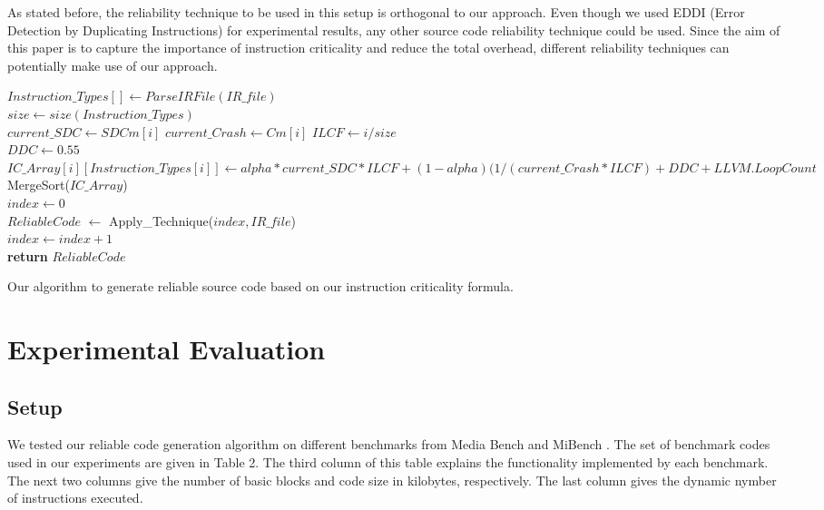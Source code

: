  As stated before, the reliability technique to be used in this setup is orthogonal to our approach. Even though we used  EDDI (Error Detection by Duplicating Instructions) \cite{EDDI:2002} for experimental results, any other source code reliability technique could be used. Since the aim of this paper is to capture the importance of instruction criticality and reduce the total overhead, different reliability techniques can potentially make use of our approach.

\begin{algorithm}
\BlankLine
$Instruction\_Types[] \longleftarrow ParseIRFile(IR\_file)$ \\
$size \longleftarrow size(Instruction\_Types)$ \\

{
{
{
$current\_SDC \longleftarrow SDCm[i]$
}
{
$current\_Crash \longleftarrow Cm[i]$
}
}
$ILCF \longleftarrow i / size$\\
{
  $DDC \longleftarrow 0.55$
}
$IC\_Array[i][Instruction\_Types[i]] \longleftarrow alpha * current\_SDC * ILCF + (1-alpha)(1/(current\_Crash * ILCF) + DDC + LLVM.LoopCount$
}
MergeSort($IC\_Array$)\\
$index \longleftarrow 0$ \\
{
   $ReliableCode$ $\longleftarrow$ Apply\_Technique($index, IR\_file$)\\
   $index \longleftarrow index + 1 $ \\
}
\textbf{return} $ReliableCode$
\caption{Our algorithm to generate reliable source code based on our instruction criticality formula.}
\end{algorithm}

\section{Experimental Evaluation}\label{sec:evaluation}

\subsection{Setup}
We tested our reliable code generation algorithm on different benchmarks from Media Bench \cite{MediaBench:1997} and MiBench \cite{MiBench:2001}. The set of benchmark codes used in our experiments are given in Table 2. The third column of this table explains the functionality implemented by each benchmark. The next two columns give the number of basic blocks and code size in kilobytes, respectively. The last column gives the dynamic nymber of instructions executed. 

